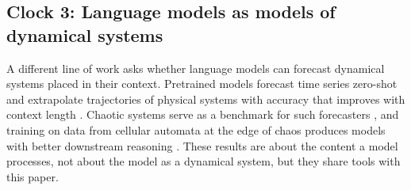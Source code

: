\subsection{Clock 3: Language models as models of dynamical systems}

A different line of work asks whether language models can forecast dynamical systems placed in their context. Pretrained models forecast time series zero-shot \citep{gruver2023large} and extrapolate trajectories of physical systems with accuracy that improves with context length \citep{liu2024llms}. Chaotic systems serve as a benchmark for such forecasters \citep{gilpin2021chaos,gilpin2023model,pathak2018model}, and training on data from cellular automata at the edge of chaos produces models with better downstream reasoning \citep{zhang2024intelligence}. These results are about the content a model processes, not about the model as a dynamical system, but they share tools with this paper.

